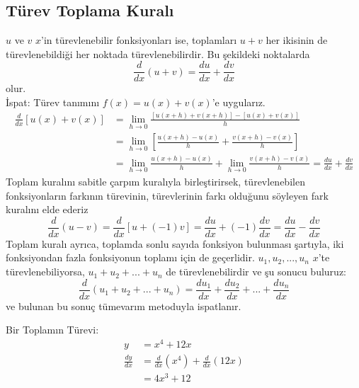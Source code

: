 \subsection{\protect Türev Toplama Kuralı}
$u$ ve $v$ $x$'in türevlenebilir fonksiyonları ise, toplamları $u + v$ her ikisinin de türevlenebildiği her noktada türevlenebilirdir. Bu şekildeki noktalarda
	\begin{equation*}
	\frac{d}{dx}(u+v) = \frac{du}{dx}+\frac{dv}{dx}
	\end{equation*}
olur.\\
İspat: Türev tanımını $f(x)= u(x) + v(x)$'e uygularız.
	\begin{equation*}
	\begin{split}
		\frac{d}{dx}[u(x) + v(x)]&=\lim_{h \rightarrow 0}\frac{[u(x+h)+v(x+h)]-[u(x)+v(x)]}{h} \\
		&=\lim_{h \rightarrow 0}\left[\frac{u(x+h)-u(x)}{h}+\frac{v(x+h)-v(x)}{h}\right]\\
		&=\lim_{h \rightarrow 0}\frac{u(x+h)-u(x)}{h}+\lim_{h \rightarrow 0}\frac{v(x+h)-v(x)}{h}=\frac{du}{dx}+\frac{dv}{dx}
	\end{split}
	\end{equation*}
Toplam kuralını sabitle çarpım kuralıyla birleştirirsek, türevlenebilen fonksiyonların farkının türevinin, türevlerinin farkı olduğunu söyleyen fark kuralını elde ederiz
	\begin{equation*}
	\frac{d}{dx}(u-v) = \frac{d}{dx}[u+(-1)v]=\frac{du}{dx}+(-1)\frac{dv}{dx}=\frac{du}{dx}-\frac{dv}{dx}
	\end{equation*}
Toplam kuralı ayrıca, toplamda sonlu sayıda fonksiyon bulunması şartıyla, iki fonksiyondan fazla fonksiyonun toplamı için de geçerlidir. $u_1,u_2,...,u_n$ $x$'te türevlenebiliyorsa, $u_1+u_2+...+u_n$ de türevlenebilirdir ve şu sonucu buluruz:
	\begin{equation*}
	\frac{d}{dx}(u_1+u_2+...+u_n)=\frac{du_1}{dx}+\frac{du_2}{dx}+...+\frac{du_n}{dx}
	\end{equation*}
ve bulunan bu sonuç tümevarım metoduyla ispatlanır.
\begin{ornek}Bir Toplamın Türevi:
	\begin{equation*}
	\begin{split}
		y&=x^4 + 12x \\
		\frac{dy}{dx}&=\frac{d}{dx}(x^4)+\frac{d}{dx}(12x)\\
		&=4x^3+12
	\end{split}
	\end{equation*}
\end{ornek}
